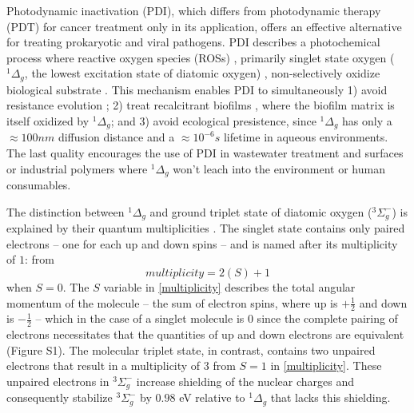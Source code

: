 Photodynamic inactivation (PDI), which differs from photodynamic therapy (PDT) for cancer treatment \cite{Lange2019ComparisonLines} only in its application, offers an effective alternative for treating prokaryotic \cite{Hamblin2004PhotodynamicDisease} and viral \cite{Wigginton2010OxidationInactivation,Lebedeva2020TheViruses} pathogens. PDI describes a photochemical process where reactive oxygen species (ROSs) \cite{Zepp1992HydroxylReaction,Koppenol2001TheLater}, primarily singlet state oxygen ($^1\Delta_g$, the lowest excitation state of diatomic oxygen) \cite{Ergaieg2008InvolvementPorphyrin, Allen2004IntroductionSimulations, Henze2019Multi-scaleCheckpoint, Zaman2005ComputationalMatrices,Gillespie2007StochasticKinetics}, non-selectively oxidize biological substrate \cite{Choe2006MechanismsOxidation,Frankel1980LipidOxidation}. This mechanism enables PDI to simultaneously 1) avoid resistance evolution \cite{Tavares2010AntimicrobialTreatment,Lauro2002PhotoinactivationConjugates,Pedigo2009AbsenceTherapy}; 2) treat recalcitrant biofilms \cite{Beirao2014PhotodynamicPorphyrin,Ghorbanzadeh2020ModulationModel}, where the biofilm matrix is itself oxidized by $^1\Delta_g$; and 3) avoid ecological presistence, since $^1\Delta_g$ has only a $\approx 100 nm$ diffusion distance and a $\approx 10^{-6} s$ lifetime \cite{Moan1984TheOxygen, Moan1990OnTissues,Rodgers1982LifetimeMeasurements} in aqueous environments. The last quality encourages the use of PDI in wastewater treatment \cite{Kohn2007AssociationOxygen,Mostafa2013SingletMatter,Jimenez-Hernandez2006SolarSensitizers} and surfaces \cite{McCoy2014PhotodynamicControl} or industrial polymers \cite{Kim2003DesignProblem} where $^1\Delta_g$ won't leach into the environment or human consumables. 

The distinction between $^1\Delta_g$ and ground triplet state of diatomic oxygen ($^3\Sigma_g^-$) \cite{DeRosa2002PhotosensitizedApplications} is explained by their quantum multiplicities \cite{Fumi1953ElectronicMolecule}. The singlet state contains only paired electrons -- one for each up and down spins -- and is named after its multiplicity of $1$: from 
\begin{equation} \label{multiplicity}
    multiplicity = 2(S)+1
\end{equation}
when $S=0$. The $S$ variable in \cref{multiplicity} describes the total angular momentum of the molecule -- the sum of electron spins, where up is $+\frac{1}{2}$ and down is $-\frac{1}{2}$ -- which in the case of a singlet molecule is 0 since the complete pairing of electrons necessitates that the quantities of up and down electrons are equivalent (Figure S1). The molecular triplet state, in contrast, contains two unpaired electrons that result in a multiplicity of $3$ from $S=1$ in \cref{multiplicity}. These unpaired electrons in $^3\Sigma_g^-$ increase shielding of the nuclear charges \cite{Katriel1972ARule} and consequently stabilize $^3\Sigma_g^-$ by $0.98$ eV \cite{Jockusch2008SingletExcitation} relative to $^1\Delta_g$ that lacks this shielding.

